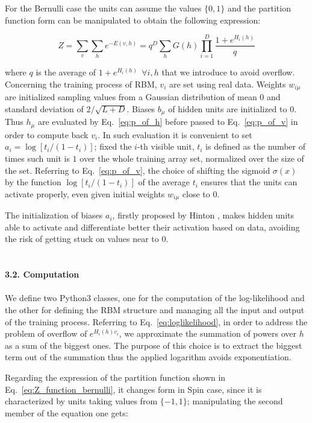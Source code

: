 \documentclass[prl,twocolumn]{revtex4-1}
\begin{document}
For the Bernulli case the units can assume the values $\{0,1\}$ and the partition function form can be manipulated to obtain the following expression:

\begin{equation}
	Z=\sum_v\sum_h{e^{-E(v,h)}}=q^D\sum_h{G(h)\prod_{i=1}^D{\frac{1+e^{H_i(h)}}{q}}}
	\label{eq:Z_function_bernulli}
\end{equation}

where $q$ is the average of $1+e^{H_i(h)}\ \ \forall{i,h}$ that we introduce to avoid overflow. Concerning the training process of RBM, $v_i$ are set using real data. Weights $w_{i\mu}$ are initialized sampling values from a Gaussian distribution of mean $0$ and standard deviation of $2/\sqrt{L+D}$. Biases $b_\mu$ of hidden units are initialized to $0$. Thus $h_\mu$ are evaluated by Eq.~\ref{eq:p_of_h} before passed to Eq.~\ref{eq:p_of_v} in order to compute back $v_i$. In such evaluation it is convenient to set $a_i=\log[t_i/(1-t_i)]$; fixed the $i$-th visible unit, $t_i$ is defined as the number of times such unit is $1$ over the whole training array set, normalized over the size of the set. Referring to Eq.~\ref{eq:p_of_v}, the choice of shifting the sigmoid $\sigma(x)$ by the function $\log[t_i/(1-t_i)]$ of the average $t_i$ ensures that the units can activate properly, even given initial weights $w_{i\mu}$ close to $0$.

The initialization of biases $a_i$, firstly proposed by Hinton \cite{pap2}, makes hidden units able to activate and differentiate better their activation based on data, avoiding the risk of getting stuck on values near to $0$.
\\
\\
\\
\noindent\textbf{3.2. Computation}
\\
\\
We define two Python3 classes, one for the computation of the log-likelihood and the other for defining the RBM structure and managing all the input and output of the training process. Referring to Eq.~\ref{eq:loglikelihood}, in order to address the problem of overflow of $e^{H_i(h)v_i}$, we approximate the summation of powers over $h$ as a sum of the biggest ones. The purpose of this choice is to extract the biggest term out of the summation thus the applied logarithm avoids exponentiation.

Regarding the expression of the partition function shown in Eq.~\ref{eq:Z_function_bernulli}, it changes form in Spin case, since it is characterized by units taking values from $\{-1,1\}$; manipulating the second member of the equation one gets:
\end{document}
